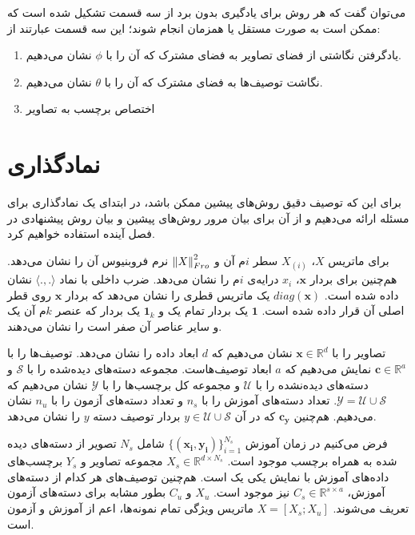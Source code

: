  می‌توان گفت که هر روش برای یادگیری بدون برد از سه قسمت تشکیل شده است که ممکن است به صورت مستقل یا همزمان انجام شوند؛ این سه قسمت عبارتند از:
\begin{enumerate}
  \item یادگرفتن نگاشتی از فضای تصاویر به فضای مشترک
  که آن را با $\phi$ نشان می‌دهیم.
  \item نگاشت توصیف‌ها به فضای مشترک
  که آن را با $\theta$ نشان می‌دهیم.
  \item اختصاص برچسب به تصاویر
\end{enumerate}

\section{نماد‌گذاری}\label{notaion}
برای این که توصیف دقیق روش‌های پیشین ممکن باشد، در ابتدای یک نمادگذاری برای مسئله ارائه می‌دهیم و از آن برای بیان مرور روش‌های پیشین و بیان روش پیشنهادی در فصل آینده استفاده خواهیم کرد.

برای ماتریس $X$،    
$X_{(i)}$
 سطر $i$م آن و 
$\left \lVert X \right \rVert_{Fro}^2$
نرم فروبنیوس آن را نشان می‌دهد. هم‌چنین برای بردار $\mathbf{x}$،
 $x_i$ 
 درایه‌ی $i$م را نشان می‌دهد.
    ضرب داخلی با نماد  $\langle ., . \rangle $ نشان داده شده است.
$diag(\mathbf{x})$
یک ماتریس قطری  را نشان می‌دهد که بردار $\mathbf{x} $ روی قطر اصلی آن قرار داده شده است.  $\mathbf{1}$ یک بردار تمام یک و $\mathbf{1}_k$ یک بردار که عنصر $k$م آن یک و سایر عناصر آن صفر است را نشان می‌دهند. 

 تصاویر را با
 $\mathbf{x}  \in \mathbb{R}^d$
 نشان می‌دهیم که $d$ ابعاد داده را نشان می‌دهد. توصیف‌ها را با
 $ \mathbf{c}  \in \mathbb{R}^a$
 نمایش می‌دهیم که  $a$ ابعاد توصیف‌هاست. مجموعه دسته‌های دیده‌شده را با  $ \mathcal{S}$ و دسته‌های دیده‌نشده را با $ \mathcal{U}$ و مجموعه کل برچسب‌ها را با $ \mathcal{Y}$
 نشان می‌دهیم که
 $ \mathcal{Y} =  \mathcal{U} \cup \mathcal{S} $.
 تعداد دسته‌های آموزش را با $n_s$ و تعداد دسته‌های آزمون را با $n_u$ نشان می‌دهیم.
هم‌چنین   $\mathbf{c_y} $ که در آن    $ y \in \mathcal{U} \cup \mathcal{S} $ بردار توصیف دسته $y$ را نشان می‌دهد.

    فرض می‌کنیم در زمان آموزش 
    $ \{ (\mathbf{x_i, y_i}) \}_{i=1}^{N_s} $
     شامل $N_s$
     تصویر از دسته‌های دیده شده به همراه برچسب  موجود است.
     $X_s \in \mathbb{R}^{d \times N_s }$
  مجموعه تصاویر و $Y_s$ برچسب‌های داده‌های آموزش با نمایش یکی یک
   است.  هم‌چنین توصیف‌های هر کدام از دسته‌های آموزش،
  $C_s \in \mathbb{R}^{s \times a}$
 نیز موجود است. $X_u$ و $C_u$ بطور مشابه برای دسته‌های آزمون تعریف می‌شوند.
$ X = [X_s;X_u]$
ماتریس ویژگی تمام نمونه‌ها، اعم از آموزش و آزمون است.


